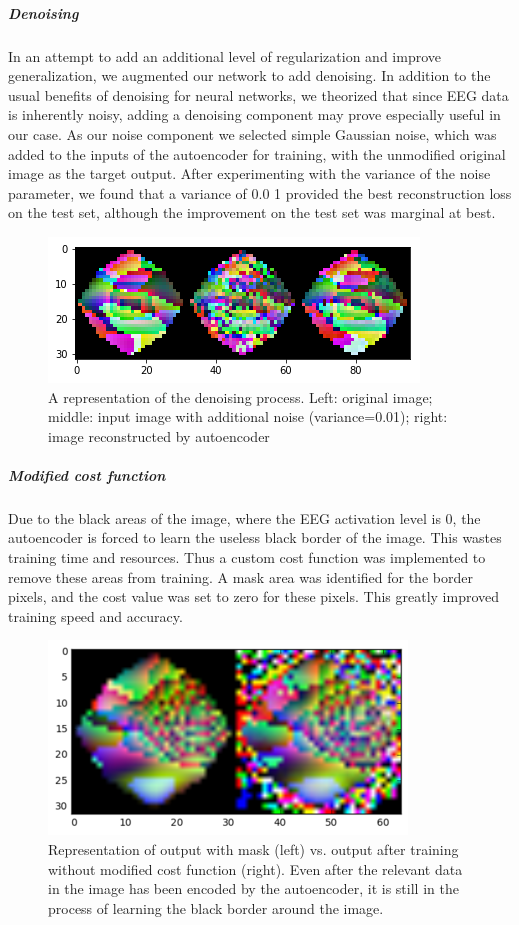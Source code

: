 \documentclass{article}
\begin{document}
\subparagraph{Denoising}
In an attempt to add an additional level of regularization and improve generalization, we augmented our network to add denoising. In addition to the usual benefits of denoising for neural networks, we theorized that since EEG data is inherently noisy, adding a denoising component may prove especially useful in our case. As our noise component we selected simple Gaussian noise, which was added to the inputs of the autoencoder for training, with the unmodified original image as the target output. After experimenting with the variance of the noise parameter, we found that a variance of 0.0 1 provided the best reconstruction loss on the test set, although the improvement on the test set was marginal at best. 
\begin{figure}[!ht]
    \centering
    \includegraphics[scale=0.75]{denoising}
    \caption{A representation of the denoising process. Left: original image; middle: input image with additional noise (variance=0.01); right: image reconstructed by autoencoder}
\end{figure}
\subparagraph{Modified cost function}
Due to the black areas of the image, where the EEG activation level is 0, the autoencoder is forced to learn the useless black border of the image. This wastes training time and resources. Thus a custom cost function was implemented to remove these areas from training. A mask area was identified for the border pixels, and the cost value was set to zero for these pixels. This greatly improved training speed and accuracy.
\begin{figure}[!ht]
    \centering
    \includegraphics[scale=0.55]{mask}
    \caption{Representation of output with mask (left) vs. output after training without modified cost function (right). Even after the relevant data in the image has been encoded by the autoencoder, it is still in the process of learning the black border around the image.}
\end{figure}
\end{document}
